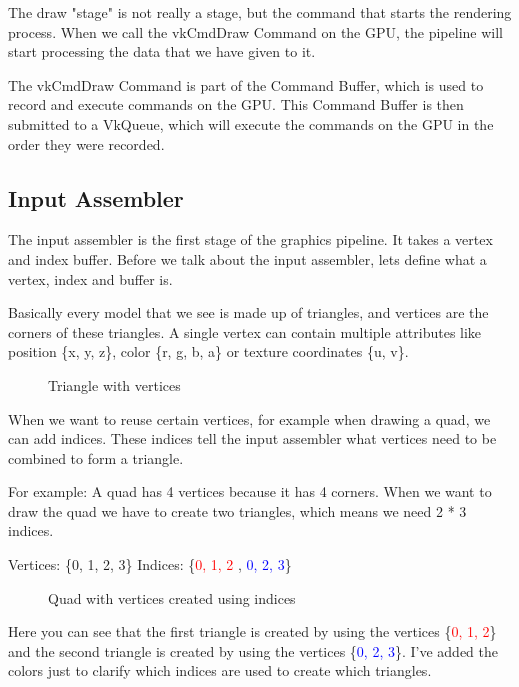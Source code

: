\documentclass[12pt]{report} \usepackage{preamble}
\begin{document}
The draw "stage" is not really a stage, but the command that starts
the rendering process. When we call the vkCmdDraw Command on the GPU,
the pipeline will start processing the data that we have given to
it. \cite{vulkan-spec-draw}

The vkCmdDraw Command is part of the Command Buffer, which is used to
record and execute commands on the GPU. This Command Buffer is then
submitted to a VkQueue, which will execute the commands on the GPU
in the order they were recorded. \cite{command-buffers}


\subsection{Input Assembler}

The input assembler is the first stage of the graphics pipeline. It takes
a vertex and index buffer. \cite{vulkan-spec-pipelines} Before we talk
about the input assembler, lets define what a vertex, index and buffer is.

Basically every model that we see is made up of triangles, and vertices
are the corners of these triangles. A single vertex can contain multiple
attributes like position \{x, y, z\}, color \{r, g, b, a\} or texture
coordinates \{u, v\}. \cite{vulkan-vertex-input}

\begin{figure}[hbtp]
	\centering 
	\caption{Triangle with vertices}
\end{figure} \FloatBarrier

When we want to reuse certain vertices, for example when
drawing a quad, we can add indices.  These indices tell the
input assembler what vertices need to be combined to form a
triangle. \cite{vulkan-tutorial-index-buffer}

For example: A quad has 4 vertices because it has 4 corners. When we want
to draw the quad we have to create two triangles, which means we need 2 *
3 indices.

Vertices: \{0, 1, 2, 3\} Indices: \{\textcolor{red}{0, 1, 2} ,
\textcolor{blue}{0, 2, 3}\}

\begin{figure}[hbtp]
	\centering 
	\caption{Quad
		with vertices created using indices}
\end{figure} \FloatBarrier

Here you can see that the first triangle is created by using the vertices
\{\textcolor{red}{0, 1, 2}\} and the second triangle is created by using
the vertices \{\textcolor{blue}{0, 2, 3}\}. I've added the colors just
to clarify which indices are used to create which triangles.
\end{document}
